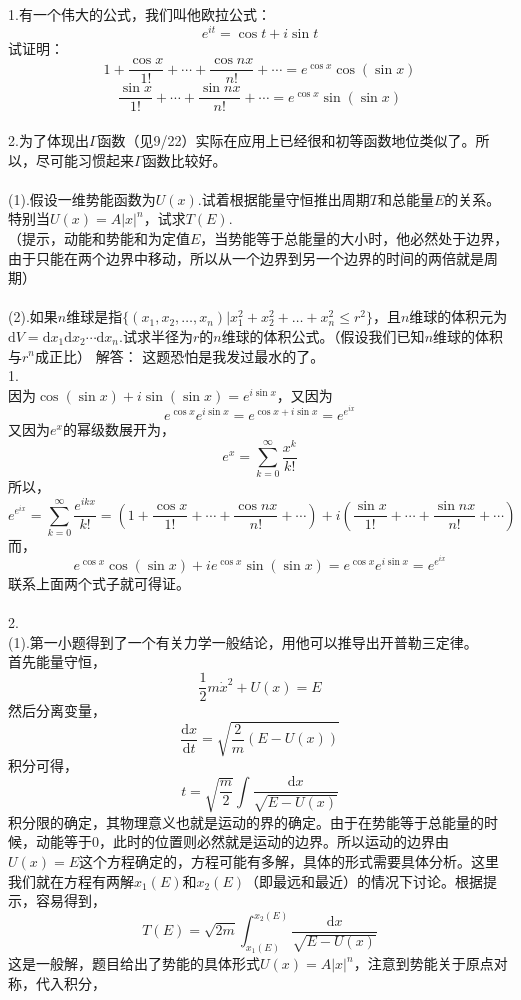 \documentclass[11pt,a4paper,openany]{article}
\begin{document}
1.有一个伟大的公式，我们叫他欧拉公式：
\[
e^{it}=\cos t+i\sin t
\]
试证明：
\[
1+\frac{\cos x}{1!}+\cdots+
\frac{\cos nx}{n!}+\cdots
=e^{\cos x}\cos{(\sin{x})}
\]
\[
\frac{\sin x}{1!}+\cdots+
\frac{\sin nx}{n!}+\cdots
=e^{\cos x}\sin{(\sin{x})}
\]
\\
2.为了体现出$\Gamma$函数（见9/22）实际在应用上已经很和初等函数地位类似了。所以，尽可能习惯起来$\Gamma$函数比较好。\\
\\
(1).假设一维势能函数为$U(x)$.试着根据能量守恒推出周期$T$和总能量$E$的关系。特别当$U(x)=A|x|^n$，试求$T(E)$.\\（提示，动能和势能和为定值$E$，当势能等于总能量的大小时，他必然处于边界，由于只能在两个边界中移动，所以从一个边界到另一个边界的时间的两倍就是周期）\\
\\
(2).如果$n$维球是指$\{(x_1,x_2,\dots,x_n)|x_1^2+x_2^2+\dots+x_n^2 \leq r^2\}$，且$n$维球的体积元为$\mathrm{d}V=\mathrm{d}x_1 \mathrm{d}x_2 \cdots \mathrm{d}x_n$.试求半径为$r$的$n$维球的体积公式。（假设我们已知$n$维球的体积与$r^n$成正比）
\newpage
解答：
这题恐怕是我发过最水的了。\\
1.\\
因为$\cos{(\sin x)}+i\sin{(\sin x)}=e^{i\sin x}$，又因为
\[
e^{\cos x}e^{i\sin x}=e^{\cos x+i\sin x}=e^{e^{ix}}
\]
又因为$e^x$的幂级数展开为，
\[
e^x=\sum_{k=0}^\infty \frac{x^k}{k!}
\]
所以，
\[
e^{e^{ix}}
=\sum_{k=0}^\infty \frac{e^{ikx}}{k!}
=\left(1+\frac{\cos x}{1!}+\cdots+
\frac{\cos nx}{n!}+\cdots\right)
+i\left(\frac{\sin x}{1!}+\cdots+
\frac{\sin nx}{n!}+\cdots\right)
\]
而，
\[
e^{\cos x}\cos{(\sin x)}+ie^{\cos x}\sin{(\sin x)}=e^{\cos x}e^{i\sin x}
=e^{e^{ix}}
\]
联系上面两个式子就可得证。
\\
\\
2.\\
(1).第一小题得到了一个有关力学一般结论，用他可以推导出开普勒三定律。\\
首先能量守恒，
\[
\frac{1}{2}m\dot{x}^2+U(x)=E
\]
然后分离变量，
\[
\frac{\mathrm{d}x}{\mathrm{d}t}
=\sqrt{\frac{2}{m}(E-U(x))}
\]
积分可得，
\[t=\sqrt{\frac{m}{2}}\int
\frac{\mathrm{d}x}{\sqrt{E-U(x)}}
\]
\indent 积分限的确定，其物理意义也就是运动的界的确定。由于在势能等于总能量的时候，动能等于$0$，此时的位置则必然就是运动的边界。所以运动的边界由$U(x)=E$这个方程确定的，方程可能有多解，具体的形式需要具体分析。这里我们就在方程有两解$x_1 (E)$和$x_2 (E)$（即最远和最近）的情况下讨论。根据提示，容易得到，
\[
T(E)=\sqrt{2m}\int^{x_2 (E)}_{x_1 (E)}\frac{\mathrm{d}x}{\sqrt{E-U(x)}}
\]
这是一般解，题目给出了势能的具体形式$U(x)=A|x|^n$，注意到势能关于原点对称，代入积分，
\end{document}
